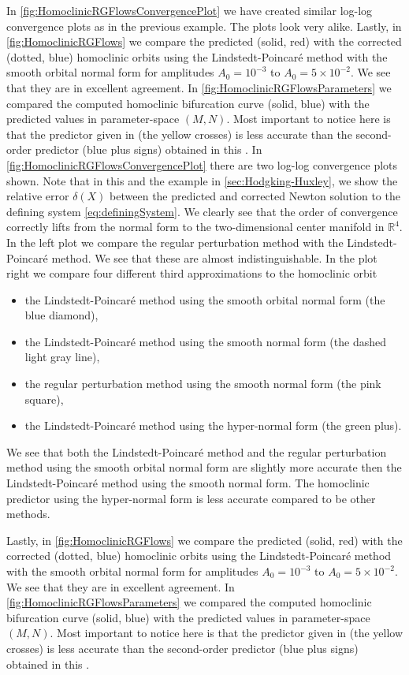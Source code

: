 \ifthesis 
In \cref{fig:HomoclinicRGFlowsConvergencePlot} we have created similar log-log
convergence plots as in the previous example. The plots look very alike.
%
Lastly, in \cref{fig:HomoclinicRGFlows}  we compare the predicted (solid, red)
with the corrected (dotted, blue) homoclinic orbits using the
Lindstedt-Poincar\'e method with the smooth orbital normal form for amplitudes
$A_0 = 10^{-3}$ to $A_0=5\times 10^{-2}$. We see that they are in excellent
agreement. In \cref{fig:HomoclinicRGFlowsParameters} we compared the
    computed homoclinic bifurcation curve (solid, blue) with the predicted
    values in parameter-space $(M, N)$. Most important to notice here is that
    the predictor given in \cite{Al-Hdaibat2016} (the yellow crosses) is less
accurate than the second-order predictor (blue plus signs) obtained in this
\paper{}. 
\else
In \cref{fig:HomoclinicRGFlowsConvergencePlot} there are two log-log
convergence plots shown. Note that in this and the example in
\cref{sec:Hodgking-Huxley}, we show the relative error $\delta(X)$ between the
predicted and corrected Newton solution to the defining system
\cref{eq:definingSystem}.  We clearly see that the order of convergence
correctly lifts from the normal form to the two-dimensional center manifold in
$\mathbb R^4$. In the left plot we compare the regular perturbation method
with the Lindstedt-Poincar\'e method. We see that these are almost
indistinguishable. In the plot right we compare four different third
approximations to the homoclinic orbit
\begin{itemize}
    \item the Lindstedt-Poincar\'e method using the smooth orbital normal form
        (the blue diamond),
    \item the Lindstedt-Poincar\'e method using the smooth normal form
        (the dashed light gray line),
    \item the regular perturbation method using the smooth normal form
        (the pink square), 
    \item the Lindstedt-Poincar\'e method using the hyper-normal form
        (the green plus).
\end{itemize}

We see that both the Lindstedt-Poincar\'e method and the regular perturbation
method using the smooth orbital normal form are slightly more accurate then the
Lindstedt-Poincar\'e method using the smooth normal form. The homoclinic
predictor using the hyper-normal form is less accurate compared to be
other methods.

Lastly, in \cref{fig:HomoclinicRGFlows}  we compare the predicted (solid, red)
with the corrected (dotted, blue) homoclinic orbits using the
Lindstedt-Poincar\'e method with the smooth orbital normal form for amplitudes
$A_0 = 10^{-3}$ to $A_0=5\times 10^{-2}$. We see that they are in excellent
agreement. In \cref{fig:HomoclinicRGFlowsParameters} we compared the
    computed homoclinic bifurcation curve (solid, blue) with the predicted
    values in parameter-space $(M, N)$. Most important to notice here is that
    the predictor given in \cite{Al-Hdaibat2016} (the yellow crosses) is less
accurate than the second-order predictor (blue plus signs) obtained in this
\paper{}. 
\fi
